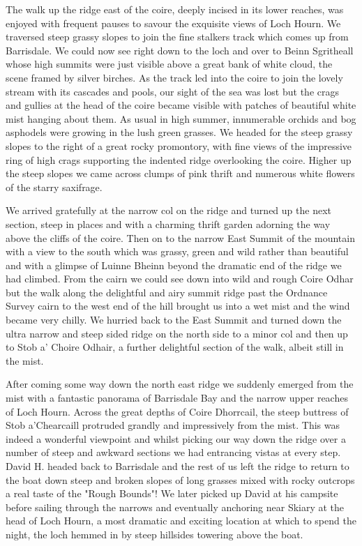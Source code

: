 \documentclass[a5paper,openany,font 10pt]{scrbook}
\begin{document}
The walk up the ridge east of the coire, deeply incised in
its lower reaches, was enjoyed with frequent pauses to savour the
exquisite views of Loch Hourn. We traversed steep grassy slopes
to join the fine stalkers track which comes up from Barrisdale.
We could now see right down to the loch and over to Beinn
Sgritheall whose high summits were just visible above a great
bank of white cloud, the scene framed by silver birches. As the
track led into the coire to join the lovely stream with its
cascades and pools, our sight of the sea was lost but the crags
and gullies at the head of the coire became visible with patches
of beautiful white mist hanging about them. As usual in high
summer, innumerable orchids and bog asphodels were growing in the
lush green grasses. We headed for the steep grassy slopes to the
right of a great rocky promontory, with fine views of the
impressive ring of high crags supporting the indented ridge
overlooking the coire. Higher up the steep slopes we came across
clumps of pink thrift and numerous white flowers of the starry
saxifrage.

We arrived gratefully at the narrow col on the ridge and
turned up the next section, steep in places and with a charming
thrift garden adorning the way above the cliffs of the coire.
Then on to the narrow East Summit of the mountain with a view to
the south which was grassy, green and wild rather than beautiful
and with a glimpse of Luinne Bheinn beyond the dramatic end of
the ridge we had climbed. From the cairn we could see down into
wild and rough Coire Odhar but the walk along the delightful and
airy summit ridge past the Ordnance Survey cairn to the west end
of the hill brought us into a wet mist and the wind became very
chilly. We hurried back to the East Summit and turned down the
ultra narrow and steep sided ridge on the north side to a minor
col and then up to Stob a' Choire Odhair, a further delightful
section of the walk, albeit still in the mist.

After coming some way down the north east ridge we suddenly
emerged from the mist with a fantastic panorama of Barrisdale Bay
and the narrow upper reaches of Loch Hourn. Across the great
depths of Coire Dhorrcail, the steep buttress of Stob
a'Chearcaill protruded grandly and impressively from the mist.
This was indeed a wonderful viewpoint and whilst picking our way
down the ridge over a number of steep and awkward sections we had
entrancing vistas at every step. David H. headed back to
Barrisdale and the rest of us left the ridge to return to the
boat down steep and broken slopes of long grasses mixed with
rocky outcrops   a real taste of the "Rough Bounds"! We later
picked up David at his campsite before sailing through the
narrows and eventually anchoring near Skiary at the head of Loch
Hourn, a most dramatic and exciting location at which to spend
the night, the loch hemmed in by steep hillsides towering above
the boat.
\end{document}
